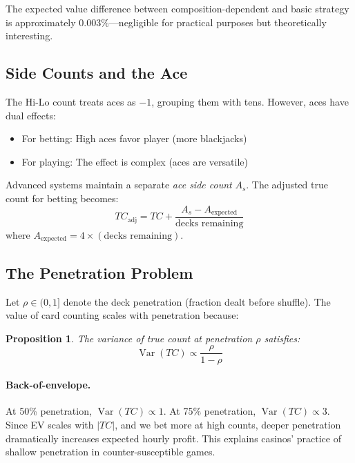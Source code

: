 \documentclass[11pt,a4paper]{article}
\newtheorem{proposition}[theorem]{Proposition}
\theoremstyle{definition}
\newcommand{\Var}{\operatorname{Var}}
\begin{document}
The expected value difference between composition-dependent and basic strategy is approximately $0.003\%$---negligible for practical purposes but theoretically interesting.

\subsection{Side Counts and the Ace}

The Hi-Lo count treats aces as $-1$, grouping them with tens. However, aces have dual effects:
\begin{itemize}[nosep]
\item For betting: High aces favor player (more blackjacks)
\item For playing: The effect is complex (aces are versatile)
\end{itemize}

Advanced systems maintain a separate \textit{ace side count} $A_s$. The adjusted true count for betting becomes:
\begin{equation}
TC_{\text{adj}} = TC + \frac{A_s - A_{\text{expected}}}{\text{decks remaining}}
\end{equation}
where $A_{\text{expected}} = 4 \times (\text{decks remaining})$.

\subsection{The Penetration Problem}

Let $\rho \in (0,1]$ denote the deck penetration (fraction dealt before shuffle). The value of card counting scales with penetration because:

\begin{proposition}
The variance of true count at penetration $\rho$ satisfies:
\begin{equation}
\Var(TC) \propto \frac{\rho}{1 - \rho}
\end{equation}
\end{proposition}

\paragraph{Back-of-envelope.} At 50\% penetration, $\Var(TC) \propto 1$. At 75\% penetration, $\Var(TC) \propto 3$. Since EV scales with $|TC|$, and we bet more at high counts, deeper penetration dramatically increases expected hourly profit. This explains casinos' practice of shallow penetration in counter-susceptible games.
\end{document}
